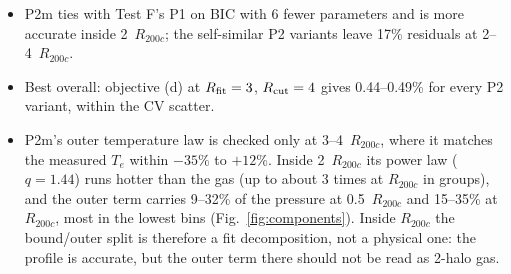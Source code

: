 \documentclass[10pt,a4paper]{article}
\newcommand{\Rc}{R_{200c}}
\newcommand{\Rfit}{R_{\rm fit}}
\newcommand{\Rcut}{R_{\rm cut}}
\begin{document}
\begin{itemize}
\item P2m ties with Test F's P1 on BIC with 6 fewer parameters and is more accurate inside 2~$\Rc$; the self-similar P2
  variants leave 17\% residuals at 2--4~$\Rc$.
\item Best overall: objective (d) at $\Rfit=3$, $\Rcut=4$ gives 0.44--0.49\% for every P2 variant, within the CV scatter.
\item P2m's outer temperature law is checked only at 3--4~$\Rc$, where it matches the measured $T_e$ within $-35\%$ to
  $+12\%$. Inside 2~$\Rc$ its power law ($q=1.44$) runs hotter than the gas (up to about 3 times at $\Rc$ in groups), and
  the outer term carries 9--32\% of the pressure at 0.5~$\Rc$ and 15--35\% at $\Rc$, most in the lowest bins
  (Fig.~\ref{fig:components}). Inside $\Rc$ the bound/outer split is therefore a fit decomposition, not a physical one:
  the profile is accurate, but the outer term there should not be read as 2-halo gas.
\end{itemize}
\end{document}
